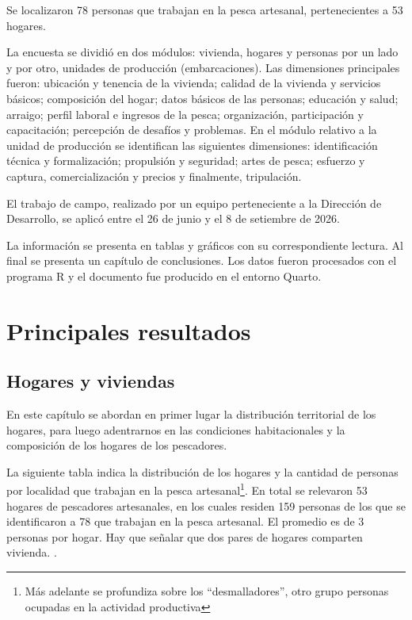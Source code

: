 \documentclass[
  letterpaper,
  DIV=11,
  numbers=noendperiod,
  justified]{scrreprt}
\begin{document}
Se localizaron 78 personas que trabajan en la pesca artesanal,
pertenecientes a 53 hogares.

La encuesta se dividió en dos módulos: vivienda, hogares y personas por
un lado y por otro, unidades de producción (embarcaciones). Las
dimensiones principales fueron: ubicación y tenencia de la vivienda;
calidad de la vivienda y servicios básicos; composición del hogar; datos
básicos de las personas; educación y salud; arraigo; perfil laboral e
ingresos de la pesca; organización, participación y capacitación;
percepción de desafíos y problemas. En el módulo relativo a la unidad de
producción se identifican las siguientes dimensiones: identificación
técnica y formalización; propulsión y seguridad; artes de pesca;
esfuerzo y captura, comercialización y precios y finalmente,
tripulación.

El trabajo de campo, realizado por un equipo perteneciente a la
Dirección de Desarrollo, se aplicó entre el 26 de junio y el 8 de
setiembre de 2026.

La información se presenta en tablas y gráficos con su correspondiente
lectura. Al final se presenta un capítulo de conclusiones. Los datos
fueron procesados con el programa R y el documento fue producido en el
entorno Quarto.

\newpage

\hypertarget{principales-resultados}{%
\chapter{Principales resultados}\label{principales-resultados}}

\hypertarget{hogares-y-viviendas}{%
\section{Hogares y viviendas}\label{hogares-y-viviendas}}

En este capítulo se abordan en primer lugar la distribución territorial
de los hogares, para luego adentrarnos en las condiciones habitacionales
y la composición de los hogares de los pescadores.

La siguiente tabla indica la distribución de los hogares y la cantidad
de personas por localidad que trabajan en la pesca artesanal\footnote{Más
  adelante se profundiza sobre los ``desmalladores'', otro grupo
  personas ocupadas en la actividad productiva}. En total se relevaron
53 hogares de pescadores artesanales, en los cuales residen 159 personas
de los que se identificaron a 78 que trabajan en la pesca artesanal. El
promedio es de 3 personas por hogar. Hay que señalar que dos pares de
hogares comparten vivienda. .
\end{document}
